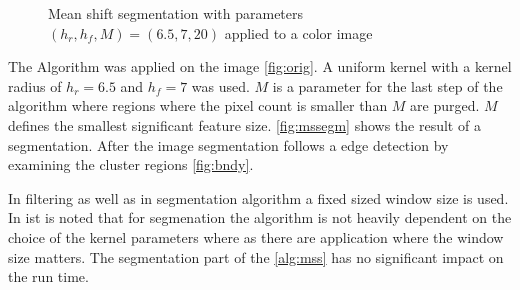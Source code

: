 \begin{figure}[ht]
\centering
{}%
%
%

\caption{Mean shift segmentation with parameters $(h_r, h_f, M) = (6.5, 7, 20)$
		 applied to a color image}
\label{fig:mssegm}
\end{figure}


The Algorithm was applied on the image \autoref{fig:orig}. A uniform kernel with
a kernel radius of $h_r = 6.5$ and $h_f = 7$ was used. $M$ is a parameter for
the last step of the algorithm where regions where the pixel count is smaller
than $M$ are purged. $M$ defines the smallest significant feature size.
\autoref{fig:mssegm} shows the result of a segmentation. After the image
segmentation follows a edge detection by examining the cluster regions
\autoref{fig:bndy}.

In filtering as well as in segmentation algorithm a fixed sized window size is 
used. In \citeauthor{citeulike:462300} \citep{citeulike:462300} ist is noted
that for segmenation the algorithm is not heavily dependent on the choice of the
kernel parameters where as there are application where the window size matters. 
The segmentation part of the \autoref{alg:mss} has no significant impact on the 
run time. 

